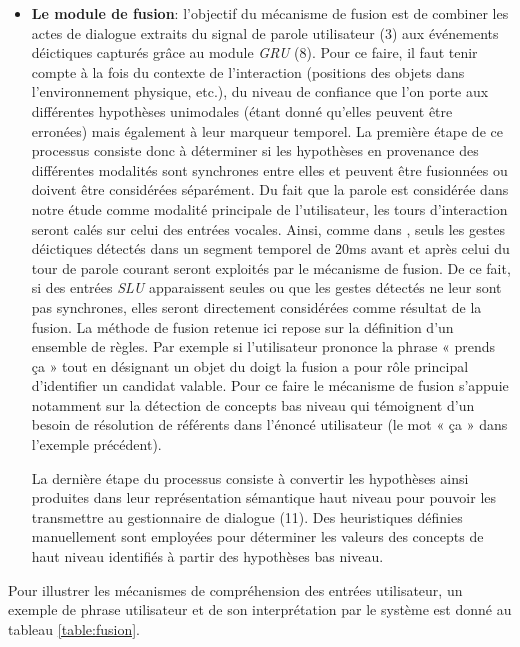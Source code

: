 \documentclass[a4paper,11pt,twoside]{StyleThese}
\begin{document}
\begin{itemize}
\item \textbf{Le module de fusion}: l’objectif du mécanisme de fusion est de combiner les actes de dialogue extraits du
signal de parole utilisateur (3) aux événements déictiques capturés grâce au module \textit{GRU} (8).
Pour ce faire, il faut tenir compte à la fois du contexte de l’interaction (positions des objets dans l’environnement physique, etc.), du niveau de confiance que l’on porte aux différentes hypothèses unimodales (étant donné qu’elles peuvent être erronées) mais également à leur marqueur temporel.
La première étape de ce processus consiste donc à déterminer si les hypothèses en
provenance des différentes modalités sont synchrones entre elles et peuvent être fusionnées ou doivent être considérées séparément. Du fait que la parole est considérée dans notre étude comme modalité principale de l’utilisateur, les tours d’interaction seront calés sur celui des entrées vocales. Ainsi, comme dans \cite{Holzapfel2004}, seuls les gestes déictiques détectés dans un segment temporel de 20ms avant et après celui du tour de parole courant seront exploités par le mécanisme de fusion. De ce fait, si des entrées \textit{SLU} apparaissent seules ou que les gestes détectés ne leur sont pas synchrones, elles seront directement considérées comme résultat de la fusion. La méthode de fusion retenue ici repose sur la définition d’un ensemble
de règles.
Par exemple si l’utilisateur prononce la
phrase « prends ça » tout en désignant un objet du doigt la fusion a pour rôle principal d’identifier un candidat valable. Pour ce faire le mécanisme de fusion s’appuie notamment sur la détection de concepts bas niveau qui témoignent d’un besoin de résolution de référents dans l’énoncé utilisateur (le mot « ça » dans l’exemple précédent).

La dernière étape du processus consiste à convertir les hypothèses ainsi produites
dans leur représentation sémantique haut niveau pour pouvoir les transmettre au gestionnaire de dialogue (11).
Des heuristiques définies manuellement sont employées pour déterminer les valeurs
des concepts de haut niveau identifiés à partir des hypothèses bas niveau.
\end{itemize}

Pour illustrer les mécanismes de compréhension des entrées utilisateur, un exemple de phrase utilisateur et de son interprétation par le système est donné au tableau \ref{table:fusion}.

\end{document}
